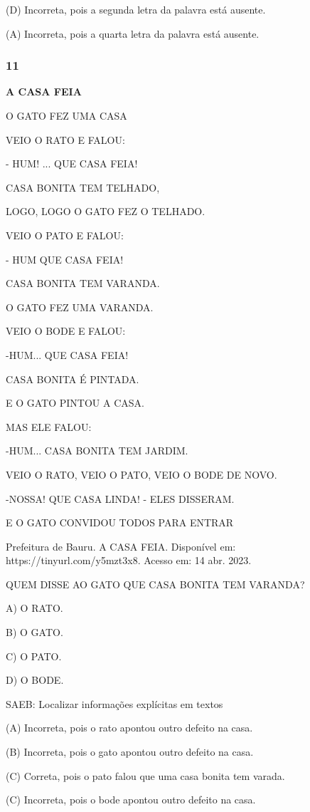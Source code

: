 (D) Incorreta, pois a segunda letra da palavra está ausente.

(A) Incorreta, pois a quarta letra da palavra está ausente.

\subsubsection{11}\label{section-51}

\textbf{A CASA FEIA}

O GATO FEZ UMA CASA

VEIO O RATO E FALOU:

- HUM! ... QUE CASA FEIA!

CASA BONITA TEM TELHADO,

LOGO, LOGO O GATO FEZ O TELHADO.

VEIO O PATO E FALOU:

- HUM QUE CASA FEIA!

CASA BONITA TEM VARANDA.

O GATO FEZ UMA VARANDA.

VEIO O BODE E FALOU:

-HUM... QUE CASA FEIA!

CASA BONITA É PINTADA.

E O GATO PINTOU A CASA.

MAS ELE FALOU:

-HUM... CASA BONITA TEM JARDIM.

VEIO O RATO, VEIO O PATO, VEIO O BODE DE NOVO.

-NOSSA! QUE CASA LINDA! - ELES DISSERAM.

E O GATO CONVIDOU TODOS PARA ENTRAR

Prefeitura de Bauru. A CASA FEIA. Disponível em: https://tinyurl.com/y5mzt3x8. Acesso em: 14 abr. 2023.

QUEM DISSE AO GATO QUE CASA BONITA TEM VARANDA?

A) O RATO.

B) O GATO.

C) O PATO.

D) O BODE.

\protect\hypertarget{_heading=h.28h4qwu}{}{}SAEB: Localizar informações
explícitas em textos

(A) Incorreta, pois o rato apontou outro defeito na casa.

(B) Incorreta, pois o gato apontou outro defeito na casa.

(C) Correta, pois o pato falou que uma casa bonita tem varada.

(C) Incorreta, pois o bode apontou outro defeito na casa.

